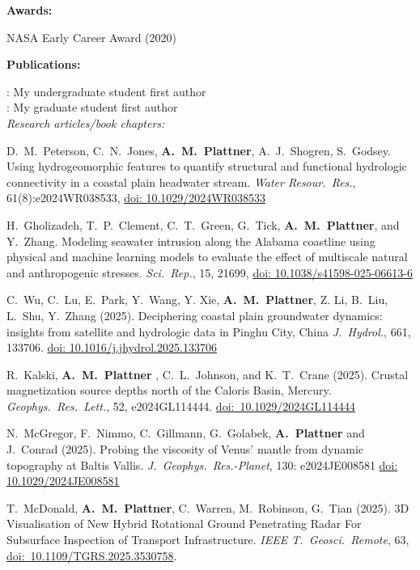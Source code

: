 \documentclass[10pt]{article}
\begin{document}
\spc
\textbf{\tsize Awards:}

\spcp
NASA Early Career Award (2020)


\spc
\textbf{\tsize Publications:}

\spcp
\ug: My undergraduate student first author\\
\gr: My graduate student first author\\


\spcp
\emph{Research articles/book chapters:}



\spcp \shift[24]
D.\ M.\ Peterson, C.\ N.\ Jones, \textbf{A.\ M.\ Plattner}, A.\ J.\ Shogren, S.\ Godsey. Using hydrogeomorphic features to quantify structural and functional hydrologic connectivity in a coastal plain headwater stream. \emph{Water Resour.\ Res.}, 61(8):e2024WR038533, \href{https://doi.org/10.1029/2024WR038533}{doi: 10.1029/2024WR038533}

\spcp \shift[23]
H.\ Gholizadeh, T.\ P.\ Clement, C.\ T.\ Green, G.\ Tick, \textbf{A.\ M.\ Plattner}, and Y.\ Zhang. Modeling seawater intrusion along the Alabama coastline  using physical and machine learning models to evaluate the effect of multiscale natural and anthropogenic stresses. \emph{Sci.\ Rep.}, 15, 21699, \href{https://doi.org/10.1038/s41598-025-06613-6}{doi: 10.1038/s41598-025-06613-6}

\spcp \shift[22] C.\ Wu, C.\ Lu, E.\ Park, Y.\ Wang, Y. Xie,
\textbf{A.\ M.\ Plattner}, Z. Li, B.\ Liu, L.\ Shu, Y.\ Zhang
(2025). Deciphering coastal plain groundwater dynamics: insights from
satellite and hydrologic data in Pinghu City, China
\emph{J.\ Hydrol.}, 661,
133706. \href{https://doi.org/10.1016/j.jhydrol.2025.133706}{doi:
  10.1016/j.jhydrol.2025.133706}

\spcp 
\grshift \gr[21] R.\ Kalski, \textbf{A.\ M.\ Plattner} , C.\ L.\ Johnson, and K.\ T.\ Crane (2025). Crustal magnetization source depths north of the Caloris Basin, Mercury. \emph{Geophys.~Res.~Lett.}, 52, e2024GL114444. \href{https://doi.org/10.1029/2024GL114444}{doi:~10.1029/2024GL114444}

\spcp
\shift[20] N.\ McGregor, F.\ Nimmo, C.\ Gillmann, G.\ Golabek, \textbf{A.\ Plattner} and J.\ Conrad (2025). Probing the viscosity of Venus' mantle from dynamic topography at Baltis Vallis. \emph{J.~Geophys.~Res.-Planet}, 130: e2024JE008581 \href{https://doi.org/10.1029/2024JE008581}{doi: 10.1029/2024JE008581}

\spcp
\shift[19]
T.\ McDonald, \textbf{A.\ M.\ Plattner}, C.\ Warren, M.\ Robinson, G.\ Tian (2025). 3D Visualisation of New Hybrid Rotational Ground Penetrating Radar For Subsurface Inspection of Transport Infrastructure. \emph{IEEE T.\ Geosci.\ Remote}, 63,  \href{https://doi.org/10.1109/TGRS.2025.3530758}{doi:~10.1109/TGRS.2025.3530758}.
\end{document}
